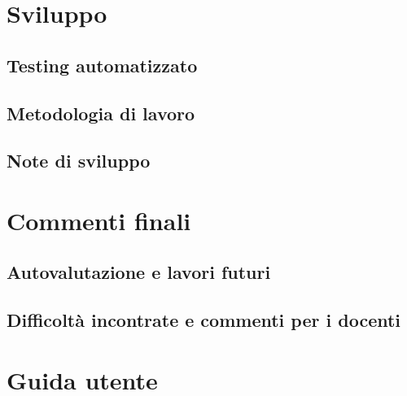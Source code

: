 \documentclass[a4paper,12pt]{report}
\begin{document}
\chapter{Sviluppo}
\section{Testing automatizzato}


\section{Metodologia di lavoro}


\section{Note di sviluppo}


\chapter{Commenti finali}


\section{Autovalutazione e lavori futuri}


\section{Difficoltà incontrate e commenti per i docenti}


\appendix
\chapter{Guida utente}


%
%
\end{document}
